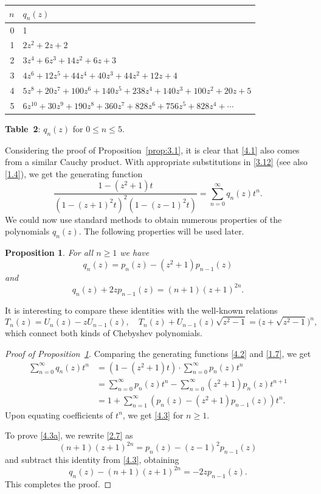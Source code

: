 \documentclass{amsart}
\theoremstyle{plain}
\newtheorem{proposition}[theorem]{Proposition}
\numberwithin{equation}{section}
\begin{document}
\medskip
\begin{center}
{\renewcommand{\arraystretch}{1.1}
\begin{tabular}{|r|l|}
\hline
$n$ & $q_n(z)$ \\
\hline
0 & 1 \\
1 & $2z^2+2z+2$ \\
2 & $3z^4+6z^3+14z^2+6z+3$ \\
3 & $4z^6+12z^5+44z^4+40z^3+44z^2+12z+4$  \\
4 & $5z^8+20z^7+100z^6+140z^5+238z^4+140z^3+100z^2+20z+5$  \\
5 & $6z^{10}+30z^9+190z^8+360z^7+828z^6+756z^5+828z^4+\cdots$  \\
\hline
\end{tabular}}

\medskip
{\bf Table~2}: $q_n(z)$ for $0\leq n\leq 5$.
\end{center}

\medskip
Considering the proof of Proposition~\ref{prop:3.1}, it is clear that 
\eqref{4.1} also comes from a similar Cauchy product. With appropriate 
substitutions in \eqref{3.12} (see also \eqref{1.4}), we get the generating
function
\begin{equation}\label{4.2}
\frac{1-(z^2+1)t}{(1-(z+1)^2t)^2(1-(z-1)^2t)}=\sum_{n=0}^\infty q_n(z)t^n.
\end{equation}
We could now use standard methods to obtain numerous properties of the
polynomials $q_n(z)$. The following properties will be used later.

\begin{proposition}\label{prop:4.1}
For all $n\geq 1$ we have
\begin{equation}\label{4.3}
q_n(z)=p_n(z)-(z^2+1)p_{n-1}(z)
\end{equation}
and
\begin{equation}\label{4.3a}
q_n(z)+2zp_{n-1}(z)=(n+1)(z+1)^{2n}.
\end{equation}
\end{proposition}

It is interesting to compare these identities with the well-known relations
\[
T_n(z) = U_n(z) - z U_{n-1}(z),\quad
T_n(z) + U_{n-1}(z)\sqrt{z^2-1} = \big(z+\sqrt{z^2-1}\big)^n,
\]
which connect both kinds of Chebyshev polynomials.

\begin{proof}[Proof of Proposition~\ref{prop:4.1}]
Comparing the generating functions \eqref{4.2} and \eqref{1.7}, we get
\begin{align*}
\sum_{n=0}^\infty q_n(z)t^n
&=\left(1-(z^2+1)t\right)\cdot\sum_{n=0}^\infty p_n(z)t^n \\
&=\sum_{n=0}^\infty p_n(z)t^n - \sum_{n=0}^\infty(z^2+1)p_n(z)t^{n+1} \\
&=1 + \sum_{n=1}^\infty\left(p_n(z)-(z^2+1)p_{n-1}(z)\right)t^n.
\end{align*}
Upon equating coefficients of $t^n$, we get \eqref{4.3} for $n\geq 1$.

To prove \eqref{4.3a}, we rewrite \eqref{2.7} as 
\[
(n+1)(z+1)^{2n} = p_n(z)-(z-1)^2p_{n-1}(z)
\]
and subtract this identity from \eqref{4.3}, obtaining
\[
q_n(z)-(n+1)(z+1)^{2n} = -2zp_{n-1}(z).
\]
This completes the proof.
\end{proof}
\end{document}
